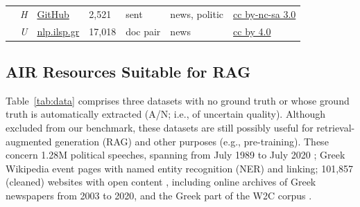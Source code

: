 \documentclass[sigconf,review,anonymous]{acmart}
\begin{document}
\begin{table}[ht]
{\begin{tabular}{lclllll}
    \citet{prokopidis2017universal} & \emph{H} & \href{https://github.com/UniversalDependencies/UD_Greek-GDT}{GitHub} & 2,521 & \sc sent & \sc news, politic &  \sc \href{http://creativecommons.org/licenses/by-nc-sa/3.0/}{cc by-nc-sa 3.0} \\
    \citet{prokopidis-2016-parallel} & \emph{U} & \href{http://nlp.ilsp.gr/pgv/}{nlp.ilsp.gr}& 17,018 & \sc doc pair & \sc news &  \sc \href{https://creativecommons.org/licenses/by/4.0/deed.en}{cc by 4.0}\\
    \bottomrule
  \end{tabular}}
\end{table}

\subsection{AIR Resources Suitable for RAG}\label{ssec:raw}
Table~\ref{tab:data} comprises three datasets with no ground truth or whose ground truth is automatically extracted ({\color{red}A/N}; i.e., of uncertain quality). Although excluded from our benchmark, these datasets are still possibly useful for retrieval-augmented generation (RAG) and other purposes (e.g., pre-training). These concern 1.28M political speeches, spanning from July 1989 to July 2020 \cite{dritsa2022greek}; Greek Wikipedia event pages with named entity recognition (NER) and linking; 101,857 (cleaned) websites with open content \cite{prokopidis2020neural}, including online archives of Greek newspapers from 2003 to 2020, and the Greek part of the W2C corpus \cite{majlivs2012language}. 
\end{document}
